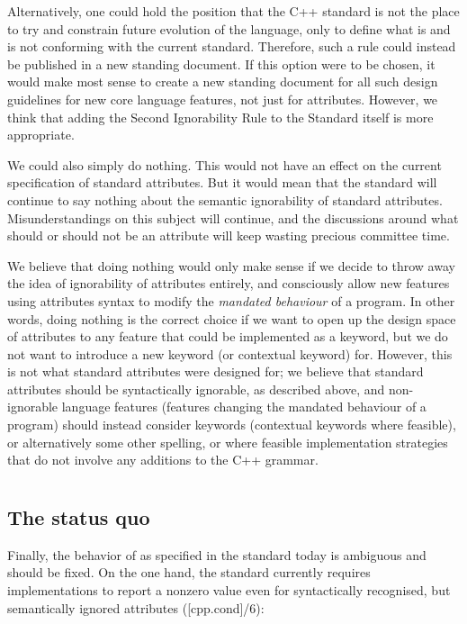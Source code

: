 Alternatively, one could hold the position that the C++ standard is not the place to try and constrain future evolution of the language, only to define what is and is not conforming with the current standard. Therefore, such a rule could instead be published in a new standing document. If this option were to be chosen, it would make most sense to create a new standing document for all such design guidelines for new core language features, not just for attributes. However, we think that adding the Second Ignorability Rule to the Standard itself is more appropriate.

We could also simply do nothing. This would not have an effect on the current specification of standard attributes. But it would mean that the standard will continue to say nothing about the semantic ignorability of standard attributes. Misunderstandings on this subject will continue, and the discussions around what should or should not be an attribute will keep wasting precious committee time.

We believe that doing nothing would only make sense if we decide to throw away the idea of ignorability of attributes entirely, and consciously allow new features using attributes syntax to modify the \emph{mandated behaviour} of a program. In other words, doing nothing is the correct choice if we want to open up the design space of attributes to any feature that could be implemented as a keyword, but we do not want to introduce a new keyword (or contextual keyword) for. However, this is not what standard attributes were designed for; we believe that standard attributes should be syntactically ignorable, as described above, and non-ignorable language features (features changing the mandated behaviour of a program) should instead consider keywords (contextual keywords where feasible), or alternatively some other spelling, or where feasible implementation strategies that do not involve any additions to the C++ grammar.

\section{}
\subsection{The status quo}

Finally, the behavior of  as specified in the standard today is ambiguous and should be fixed. On the one hand, the standard currently requires implementations to report a nonzero value even for syntactically recognised, but semantically ignored attributes ([cpp.cond]/6):

